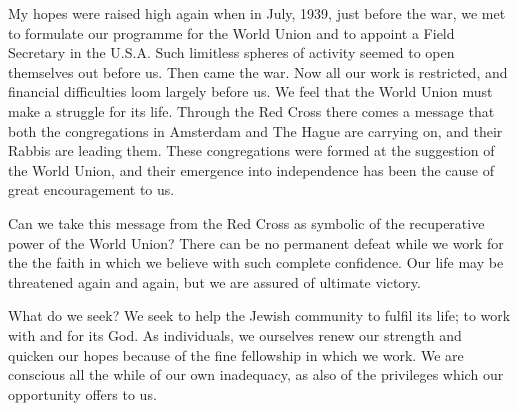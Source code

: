 My hopes were raised high again when in July, 1939,
just before the war, we met to formulate our programme
for the World Union and to appoint a Field Secretary in
the U.S.A. Such limitless spheres of activity seemed to
open themselves out before us. Then came the war.
Now all our work is restricted, and financial difficulties
loom largely before us. We feel that the World Union
must make a struggle for its life. Through the Red Cross
there comes a message that both the congregations in
Amsterdam and The Hague are carrying on, and their
Rabbis are leading them. These congregations were
formed at the suggestion of the World Union, and their
emergence into independence has been the cause of great
encouragement to us.

Can we take this message from the Red Cross as
symbolic of the recuperative power of the World Union?
There can be no permanent defeat while we work for the
the faith in which we believe with such complete
confidence. Our life may be threatened again and again,
but we are assured of ultimate victory.

What do we seek? We seek to help the Jewish
community to fulfil its life; to work with and for its
God. As individuals, we ourselves renew our strength
and quicken our hopes because of the fine fellowship in
which we work. We are conscious all the while of our
own inadequacy, as also of the privileges which our
opportunity offers to us.

